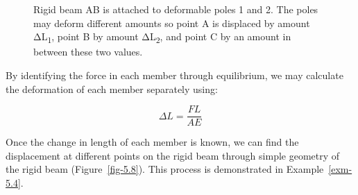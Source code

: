 \documentclass[
  letterpaper,
  DIV=11,
  numbers=noendperiod]{scrreprt}
\theoremstyle{definition}
\theoremstyle{remark}
\begin{document}
\begin{figure}


\caption{\label{fig-5.7}Rigid beam AB is attached to deformable poles 1
and 2. The poles may deform different amounts so point A is displaced by
amount ΔL\textsubscript{1}, point B by amount ΔL\textsubscript{2}, and
point C by an amount in between these two values.}

\end{figure}%

By identifying the force in each member through equilibrium, we may
calculate the deformation of each member separately using:

\[
\Delta L=\frac{F L}{A E}
\]

Once the change in length of each member is known, we can find the
displacement at different points on the rigid beam through simple
geometry of the rigid beam (Figure~\ref{fig-5.8}). This process is
demonstrated in Example~\ref{exm-5.4}.
\end{document}
